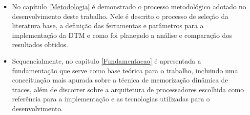 \begin{itemize}


	\item No capítulo \ref{Metodologia} é demonstrado o processo metodológico adotado no desenvolvimento deste trabalho. Nele é descrito o processo de seleção da literatura base, a definição das ferramentas e parâmetros para a implementação da DTM e como foi planejado a análise e comparação dos resultados obtidos.

	\item Sequencialmente, no capítulo \ref{Fundamentacao} é apresentada a fundamentação que serve como base teórica para o trabalho, incluindo uma conceituação mais apurada sobre a técnica de memorização dinâmica de traces, além de discorrer sobre a arquitetura de processadores escolhida como referência para a implementação e as tecnologias utilizadas para o desenvolvimento.
	

%
%
%

	
\end{itemize}

